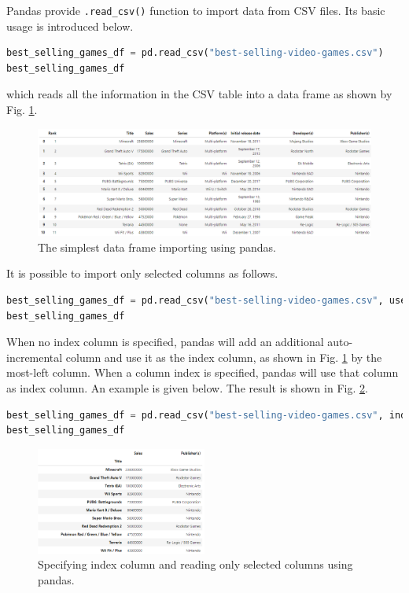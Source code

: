 Pandas provide \verb|.read_csv()| function to import data from CSV files. Its basic usage is introduced below.
\begin{lstlisting}[language=python]
best_selling_games_df = pd.read_csv("best-selling-video-games.csv")
best_selling_games_df
\end{lstlisting}
which reads all the information in the CSV table into a data frame as shown by Fig. \ref{fig:dfexp}.
\begin{figure}[htbp]
	\centering
	\includegraphics[width=\textwidth]{./chapters/ch-python/figures/df_example.png}
	\caption{The simplest data frame importing using pandas.}
	\label{fig:dfexp}
\end{figure}
It is possible to import only selected columns as follows.
\begin{lstlisting}[language=python]
best_selling_games_df = pd.read_csv("best-selling-video-games.csv", usecols = ["Title", "Sales", "Publisher(s)"])
best_selling_games_df
\end{lstlisting}

When no index column is specified, pandas will add an additional auto-incremental column and use it as the index column, as shown in Fig. \ref{fig:dfexp} by the most-left column. When a column index is specified, pandas will use that column as index column. An example is given below. The result is shown in Fig. \ref{fig:dfex2}.
\begin{lstlisting}[language=python]
best_selling_games_df = pd.read_csv("best-selling-video-games.csv", index_col = "Title", usecols = ["Title", "Sales", "Publisher(s)"])
best_selling_games_df
\end{lstlisting}
\begin{figure}[htbp]
	\centering
	\includegraphics[width=0.5\textwidth]{./chapters/ch-python/figures/df_example2.png}
	\caption{Specifying index column and reading only selected columns using pandas.}
	\label{fig:dfex2}
\end{figure}

